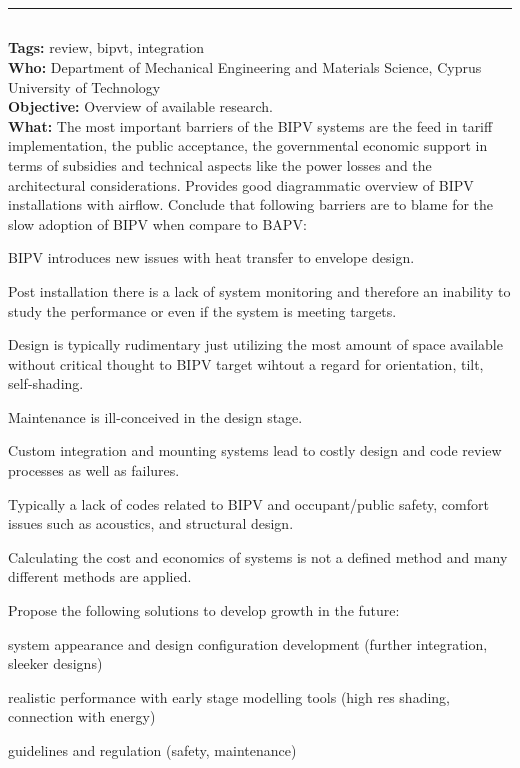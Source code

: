 \documentclass[11pt,a4paper]{article}
\newenvironment{itemize*}%
  {\begin{itemize}[rightmargin=\dimexpr\linewidth-120mm-\leftmargin\relax]%
    \setlength{\itemsep}{0pt}%
    \setlength{\parskip}{0pt}}%
  {\end{itemize}}
\begin{document}
\noindent\rule{\textwidth}{1pt}
\subsection*{}
\textbf{Tags:}  review, bipvt, integration \\
\textbf{Who:} Department of Mechanical Engineering and Materials Science, Cyprus University of Technology \\
\textbf{Objective:} Overview of available research.  \\
\textbf{What:} The most important barriers of the BIPV systems are the feed in tariff implementation, the public acceptance, the governmental economic support in terms of subsidies and technical aspects like the power losses and the architectural considerations. Provides good diagrammatic overview of BIPV installations with airflow. Conclude that following barriers are to blame for the slow adoption of BIPV when compare to BAPV:

\begin{itemize*}
    \item BIPV introduces new issues with heat transfer to envelope design.
    \item Post installation there is a lack of system monitoring and therefore an inability to study the performance or even if the system is meeting targets.
    \item Design is typically rudimentary just utilizing the most amount of space available without critical thought to BIPV target wihtout a regard for orientation, tilt, self-shading.
    \item Maintenance is ill-conceived in the design stage.
    \item Custom integration and mounting systems lead to costly design and code review processes as well as failures.
    \item Typically a lack of codes related to BIPV and occupant/public safety, comfort issues such as acoustics, and structural design.
    \item Calculating the cost and economics of systems is not a defined method and many different methods are applied.
\end{itemize*}

Propose the following solutions to develop growth in the future:

\begin{itemize*}
    \item system appearance and design configuration development (further integration, sleeker designs)
    \item realistic performance with early stage modelling tools (high res shading, connection with energy)
    \item guidelines and regulation (safety, maintenance)
\end{itemize*}
\end{document}
